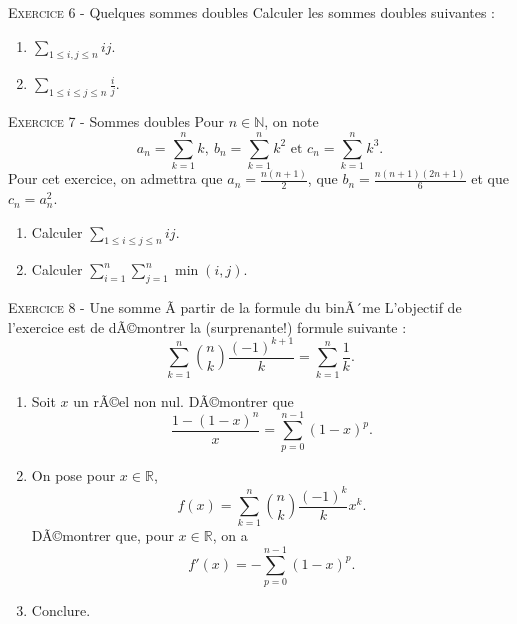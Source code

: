\documentclass[11pt]{article}
\begin{document}


\vskip0.3cm\noindent\textsc{Exercice 6} - Quelques sommes doubles
\vskip0.2cm
Calculer les sommes doubles suivantes :
\begin{enumerate}
\item $\sum_{1\leq i,j\leq n}ij$.
\item $\sum_{1\leq i\leq j\leq n}\frac ij$.
\end{enumerate}




\vskip0.3cm\noindent\textsc{Exercice 7} - Sommes doubles
\vskip0.2cm
Pour $n\in\mathbb N$, on note
$$a_n=\sum_{k=1}^n k,\ b_n=\sum_{k=1}^n k^2\textrm{ et }c_n=\sum_{k=1}^n k^3.$$
Pour cet exercice, on admettra que $\displaystyle a_n=\frac{n(n+1)}2$, que $\displaystyle b_n=\frac{n(n+1)(2n+1)}6$ et que $c_n=a_n^2$.
\begin{enumerate}
\item Calculer $\displaystyle \sum_{1\leq i\leq j\leq n} ij$.
\item  Calculer $\displaystyle \sum_{i=1}^n\sum_{j=1}^n \min(i,j)$.
\end{enumerate}




\vskip0.3cm\noindent\textsc{Exercice 8} - Une somme Ã  partir de la formule du binÃ´me
\vskip0.2cm
L'objectif de l'exercice est de dÃ©montrer la (surprenante!) formule suivante :
$$\sum_{k=1}^n \binom nk\frac{(-1)^{k+1}}k=\sum_{k=1}^n\frac 1k.$$
\begin{enumerate}
\item Soit $x$ un rÃ©el non nul. DÃ©montrer que 
$$\frac{1-(1-x)^n}{x}=\sum_{p=0}^{n-1}(1-x)^p.$$
\item On pose pour $x\in\mathbb R$, 
$$f(x)=\sum_{k=1}^n \binom nk \frac{(-1)^k}k x^k.$$
DÃ©montrer que, pour $x\in\mathbb R$, on a  
$$f'(x)=-\sum_{p=0}^{n-1}(1-x)^p.$$
\item Conclure.
\end{enumerate}





\vskip0.5cm

\end{document}
